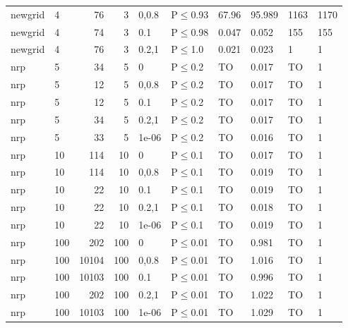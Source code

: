 \begin{longtable}{llrrllllll}
 newgrid       & 4         &     	76 &    3 & 0,0.8 & P$\leq$0.93  & 67.96   & 95.989   & 1163   & 1170   \\
 newgrid       & 4         &     	74 &    3 & 0.1   & P$\leq$0.98  & 0.047   & 0.052    & 155    & 155    \\
 newgrid       & 4         &     	76 &    3 & 0.2,1 & P$\leq$1.0   & 0.021   & 0.023    & 1      & 1      \\
 nrp           & 5         &     	34 &    5 & 0     & P$\leq$0.2   & TO      & 0.017    & TO     & 1      \\
 nrp           & 5         &     	12 &    5 & 0,0.8 & P$\leq$0.2   & TO      & 0.017    & TO     & 1      \\
 nrp           & 5         &     	12 &    5 & 0.1   & P$\leq$0.2   & TO      & 0.017    & TO     & 1      \\
 nrp           & 5         &     	34 &    5 & 0.2,1 & P$\leq$0.2   & TO      & 0.017    & TO     & 1      \\
 nrp           & 5         &     	33 &    5 & 1e-06 & P$\leq$0.2   & TO      & 0.016    & TO     & 1      \\
 nrp           & 10        &    	114 &   10 & 0     & P$\leq$0.1   & TO      & 0.017    & TO     & 1      \\
 nrp           & 10        &    	114 &   10 & 0,0.8 & P$\leq$0.1   & TO      & 0.019    & TO     & 1      \\
 nrp           & 10        &     	22 &   10 & 0.1   & P$\leq$0.1   & TO      & 0.019    & TO     & 1      \\
 nrp           & 10        &     	22 &   10 & 0.2,1 & P$\leq$0.1   & TO      & 0.018    & TO     & 1      \\
 nrp           & 10        &     	22 &   10 & 1e-06 & P$\leq$0.1   & TO      & 0.019    & TO     & 1      \\
 nrp           & 100       &    	202 &  100 & 0     & P$\leq$0.01  & TO      & 0.981    & TO     & 1      \\
 nrp           & 100       &  	10104 &  100 & 0,0.8 & P$\leq$0.01  & TO      & 1.016    & TO     & 1      \\
 nrp           & 100       &  	10103 &  100 & 0.1   & P$\leq$0.01  & TO      & 0.996    & TO     & 1      \\
 nrp           & 100       &    	202 &  100 & 0.2,1 & P$\leq$0.01  & TO      & 1.022    & TO     & 1      \\
 nrp           & 100       &  	10103 &  100 & 1e-06 & P$\leq$0.01  & TO      & 1.029    & TO     & 1      \\

\end{longtable}
